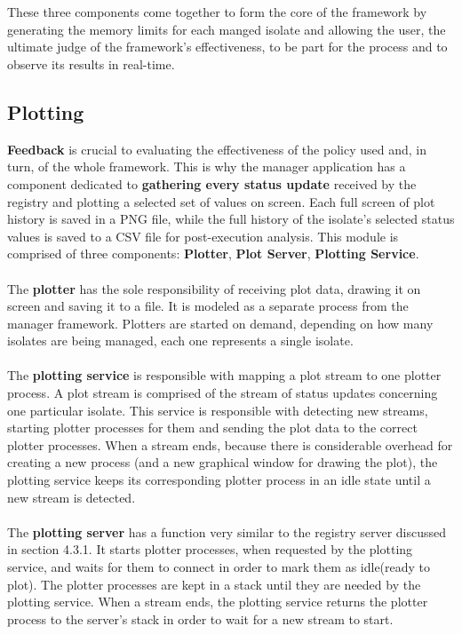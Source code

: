 \documentclass{l4proj}
\begin{document}
\\\\
\hspace*{3em} These three components come together to form the core of the framework by generating the memory limits for each manged isolate and allowing the user, the ultimate judge of the framework's effectiveness, to be part for the process and to observe its results in real-time. 
\subsection{Plotting}
\hspace*{3em} \textbf{Feedback} is crucial to evaluating the effectiveness of the policy used and, in turn, of the whole framework. This is why the manager application has a component dedicated to \textbf{gathering every status update} received by the registry and plotting a selected set of values on screen. Each full screen of plot history is saved in a PNG file, while the full history of the isolate's selected status values is saved to a CSV file for post-execution analysis. This module is comprised of three components: \textbf{Plotter}, \textbf{Plot Server}, \textbf{Plotting Service}.
\\\\
\hspace*{3em}  The \textbf{plotter} has the sole responsibility of receiving plot data, drawing it on screen and saving it to a file. It is modeled as a separate process from the manager framework. Plotters are started on demand, depending on how many isolates are being managed, each one represents a single isolate. 
\\\\
\hspace*{3em}  The \textbf{plotting service} is responsible with mapping a plot stream to one plotter process. A plot stream is comprised of the stream of status updates concerning one particular isolate. This service is responsible with detecting new streams, starting plotter processes for them and sending the plot data to the correct plotter processes. When a stream ends, because there is considerable overhead for creating a new process (and a new graphical window for drawing the plot), the plotting service keeps its corresponding plotter process in an idle state until a new stream is detected.
\\\\
\hspace*{3em} The \textbf{plotting server} has a function very similar to the registry server discussed in section 4.3.1. It starts plotter processes, when requested by the plotting service, and waits for them to connect in order to mark them as idle(ready to plot). The plotter processes are kept in a stack until they are needed by the plotting service. When a stream ends, the plotting service returns the plotter process to the server's stack in order to wait for a new stream to start.
\end{document}
